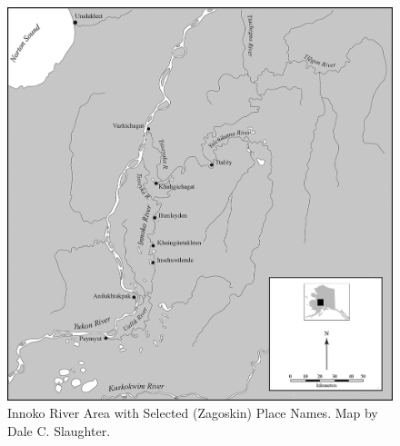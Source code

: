 \begin{figure}[ht]
    \centering
    \includegraphics[width=\textwidth]{figures/pratt-fig3.png}
    \caption{Innoko River Area with Selected (Zagoskin) Place Names. Map by Dale C. Slaughter. }
    \label{pratt-fig3}
\end{figure}


